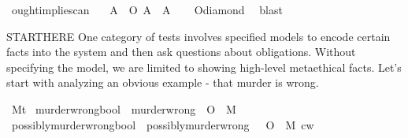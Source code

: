 \begin{isabellebody}
\isamarkupfalse%
\ ought{\isacharunderscore}implies{\isacharunderscore}can{\isacharcolon}\isanewline
\ \ \ {\isachardoublequoteopen}{\isasymforall}A{\isachardot}\ {\isasymTurnstile}\ {\isacharparenleft}O\ {\isacharbraceleft}A{\isacharbraceright}\ \isactrlbold {\isasymrightarrow}\ {\isacharparenleft}{\isasymdiamond}A{\isacharparenright}{\isacharparenright}{\isachardoublequoteclose}\isanewline
%
\isadelimproof
\ \ %
\endisadelimproof
%
\isatagproof
{}\isamarkupfalse%
\ O{\isacharunderscore}diamond\ \isamarkupfalse%
\ blast\isanewline
%
\endisatagproof
{\isafoldproof}%
%
\isadelimproof
%
\endisadelimproof
%
\isadelimproof
%
\endisadelimproof
%
\isatagproof
%
\endisatagproof
{\isafoldproof}%
%
\isadelimproof
%
\endisadelimproof
%
\isadelimproof
%
\endisadelimproof
%
\isatagproof
%
\endisatagproof
{\isafoldproof}%
%
\isadelimproof
%
\endisadelimproof
%
\isadelimdocument
%
\endisadelimdocument
%
\isatagdocument
%
\isamarkuptrue%
%
\endisatagdocument
{\isafolddocument}%
%
\isadelimdocument
%
\endisadelimdocument
%
\begin{isamarkuptext}%
STARTHERE One category of tests involves specified models to encode certain facts 
into the system and then ask questions about obligations. Without specifying the model, we are limited 
to showing high-level metaethical facts. Let's start with analyzing an obvious example - that murder is 
wrong.%
\end{isamarkuptext}\isamarkuptrue%
\isamarkupfalse%
\ M{\isacharcolon}{\isacharcolon}{\isachardoublequoteopen}t{\isachardoublequoteclose}\isanewline
{}\isamarkupfalse%
\ murder{\isacharunderscore}wrong{\isacharcolon}{\isacharcolon}{\isachardoublequoteopen}bool{\isachardoublequoteclose}\ \ {\isachardoublequoteopen}murder{\isacharunderscore}wrong\ {\isasymequiv}\ {\isasymTurnstile}{\isacharparenleft}O\ {\isacharbraceleft}\isactrlbold {\isasymnot}\ M{\isacharbraceright}{\isacharparenright}{\isachardoublequoteclose}\isanewline
%
\isadelimproof
%
\endisadelimproof
%
\isatagproof
%
\endisatagproof
{\isafoldproof}%
%
\isadelimproof
\isanewline
%
\endisadelimproof
{}\isamarkupfalse%
\ possibly{\isacharunderscore}murder{\isacharunderscore}wrong{\isacharcolon}{\isacharcolon}{\isachardoublequoteopen}bool{\isachardoublequoteclose}\ \ {\isachardoublequoteopen}possibly{\isacharunderscore}murder{\isacharunderscore}wrong\ {\isasymequiv}\ {\isacharparenleft}{\isasymdiamond}\ {\isacharparenleft}O\ {\isacharbraceleft}\isactrlbold {\isasymnot}\ M{\isacharbraceright}{\isacharparenright}{\isacharparenright}\ cw{\isachardoublequoteclose}\isanewline

\end{isabellebody}
